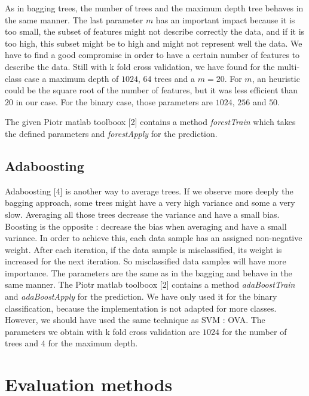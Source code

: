 \documentclass{article} %
\begin{document}
As in bagging trees, the number of trees and the maximum depth tree behaves in the same manner. The last parameter $m$ has an important impact because it is too small, the subset of features might not describe correctly the data, and if it is too high, this subset might be to high and might not represent well the data. We have to find a good compromise in order to have a certain number of features to describe the data. Still with k fold cross validation, we have found for the multi-class case a maximum depth of $1024$,  $64$ trees and a $m = 20$. For $m$, an heuristic could be the square root of the number of features, but it was less efficient than $20$ in our case. For the binary case, those parameters are $1024$, $256$ and $50$.

The given Piotr matlab toolboox [2] contains a method \textit{forestTrain} which takes the defined parameters and \textit{forestApply} for the prediction.

\subsection{Adaboosting}

Adaboosting [4] is another way to average trees. If we observe more deeply the bagging approach, some trees might have a very high variance and some a very slow. Averaging all those trees decrease the variance and have a small bias. Boosting is the opposite : decrease the bias when averaging and have a small variance. In order to achieve this, each data sample has an assigned non-negative weight. After each iteration, if the data sample is misclassified, its weight is increased for the next iteration. So misclassified data samples will have more importance. The parameters are the same as in the bagging and behave in the same manner. The Piotr matlab toolboox [2] contains a method \textit{adaBoostTrain} and \textit{adaBoostApply} for the prediction. We have only used it for the binary classification, because the implementation is not adapted for more classes. However, we should have used the same technique as SVM : OVA. The parameters we obtain with k fold cross validation are $1024$ for the number of trees and $4$ for the maximum depth.

\section{Evaluation methods}
\end{document}
